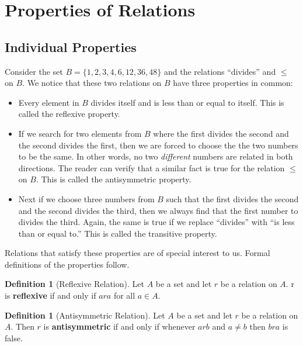 \documentclass[10pt,]{book}
\newcommand{\terminology}[1]{\textbf{#1}}
\theoremstyle{plain}
\theoremstyle{definition}
\newtheorem{definition}[theorem]{Definition}
\theoremstyle{definition}
\theoremstyle{definition}
\theoremstyle{definition}
\begin{document}
\section[Properties of Relations]{Properties of Relations}\label{s-properties-of-relations}
\typeout{************************************************}
\typeout{************************************************}
\subsection[Individual Properties]{Individual Properties}\label{ss-individual-properties}
Consider the set \(B = \{1, 2, 3, 4, 6, 12, 36, 48\}\) and the relations ``divides'' and \(\leq \) on \(B\). We notice that these two relations on \(B\) have three properties in common:%
\par
\leavevmode%
\begin{itemize}[label=\textbullet]
\item{}Every element in \(B\) divides itself and is less than or equal to itself. This is called the reflexive property.%
\item{}If we search for two elements from \(B\) where the first divides the second and the second divides the first, then we are forced to choose the the two numbers to be the same. In other words, no two \emph{different} numbers are related in both directions. The reader can verify that a similar fact is true for the relation \(\leq \) on \(B\). This is called the antisymmetric property.%
\item{}Next if we choose three numbers from \(B\) such that the first divides the second and the second divides the third, then we always find that the first number to divides the third.  Again, the same is true if we replace ``divides'' with ``is less than or equal to.'' This is called the transitive property.%
\end{itemize}
%
\par
Relations that satisfy these properties are of special interest to us. Formal definitions of the properties follow.%
\begin{definition}[Reflexive Relation]\label{def-reflexive-relation}
Let \(A\) be a set and let \(r\) be a relation on \(A\).
r is \terminology{reflexive} if and only if \(a r a\) for all \(a \in A\).%
\end{definition}
\begin{definition}[Antisymmetric Relation]\label{def-antisymmetric-relation}
Let \(A\) be a set and let \(r\) be a relation on \(A\).  Then \(r\) is \terminology{antisymmetric} if and only if whenever \(a r b\) and \(a \neq  b\) then \(b r a\) is false.%
\end{definition}
\end{document}
